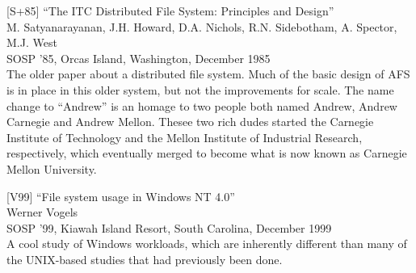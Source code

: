 {[}S+85{]} ``The ITC Distributed File System: Principles and Design''\\
M. Satyanarayanan, J.H. Howard, D.A. Nichols, R.N. Sidebotham, A.
Spector, M.J. West\\
SOSP '85, Orcas Island, Washington, December 1985\\
The older paper about a distributed file system. Much of the basic
design of AFS is in place in this older system, but not the improvements
for scale. The name change to ``Andrew'' is an homage to two people both
named Andrew, Andrew Carnegie and Andrew Mellon. Thesee two rich dudes
started the Carnegie Institute of Technology and the Mellon Institute of
Industrial Research, respectively, which eventually merged to become
what is now known as Carnegie Mellon University.

{[}V99{]} ``File system usage in Windows NT 4.0''\\
Werner Vogels\\
SOSP '99, Kiawah Island Resort, South Carolina, December 1999\\
A cool study of Windows workloads, which are inherently different than
many of the UNIX-based studies that had previously been done.
